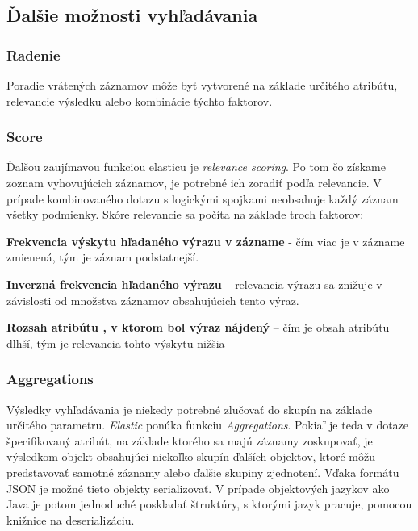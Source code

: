 \documentclass[
  print, %
  table,   %
  lof,     %
  nolot,     %
]{fithesis3}
\begin{document}
\subsection{Ďalšie možnosti vyhľadávania}							
\subsubsection{Radenie}
Poradie vrátených záznamov môže byť vytvorené na základe určitého atribútu, relevancie výsledku alebo kombinácie týchto faktorov.
\subsubsection{Score}
Ďalšou zaujímavou funkciou elasticu je \textit{relevance scoring}. Po tom čo získame zoznam vyhovujúcich záznamov, je potrebné ich zoradiť podľa relevancie. V prípade kombinovaného dotazu s logickými spojkami neobsahuje každý záznam všetky podmienky. Skóre relevancie sa počíta na základe troch faktorov:
\begin{compactenum}
	\item \textbf{Frekvencia výskytu hľadaného výrazu v zázname} - čím viac je v zázname zmienená, tým je záznam podstatnejší.
	\item \textbf{Inverzná frekvencia hľadaného výrazu} – relevancia výrazu sa znižuje v závislosti od množstva záznamov obsahujúcich tento výraz.
	\item \textbf{Rozsah atribútu , v ktorom bol výraz nájdený} – čím je obsah atribútu dlhší, tým je relevancia tohto výskytu nižšia
\end{compactenum}
\subsubsection{Aggregations}			
Výsledky vyhľadávania je niekedy potrebné zlučovať do skupín na základe určitého parametru. \textit{Elastic} ponúka funkciu \textit{Aggregations}. Pokiaľ je teda v dotaze špecifikovaný atribút, na základe ktorého sa majú záznamy zoskupovať, je výsledkom objekt obsahujúci niekoľko skupín ďalších objektov, ktoré môžu predstavovať samotné záznamy alebo ďalšie skupiny zjednotení. Vďaka formátu JSON je možné tieto objekty serializovať. V prípade objektových jazykov ako Java je potom jednoduché poskladať štruktúry, s ktorými jazyk pracuje, pomocou knižnice na deserializáciu.  
\end{document}

